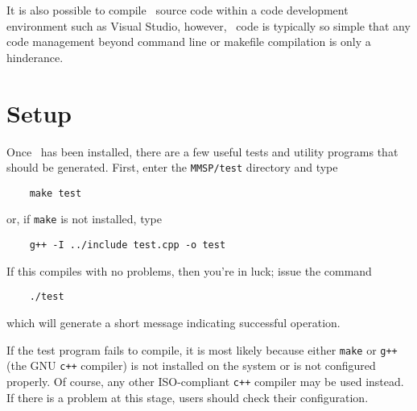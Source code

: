 It is also possible to compile \MMSP\ source code within a code development environment such as Visual Studio, however, \MMSP\ code is typically so simple that any code management beyond command line or makefile compilation is only a hinderance.

\section{Setup}
Once \MMSP\ has been installed, there are a few useful tests and utility programs that should be generated.  First, enter the {\tt MMSP/test} directory and type
\begin{shadebox}
\begin{verbatim}
    make test
\end{verbatim}
\end{shadebox}
or, if {\tt make} is not installed, type
\begin{shadebox}
\begin{verbatim}
    g++ -I ../include test.cpp -o test
\end{verbatim}
\end{shadebox}
If this compiles with no problems, then you're in luck; issue the command
\begin{shadebox}
\begin{verbatim}
    ./test
\end{verbatim}
\end{shadebox}
which will generate a short message indicating successful operation.

If the test program fails to compile, it is most likely because either {\tt make} or {\tt g++} (the GNU {\tt c++} compiler) is not installed on the system or is not configured properly.  Of course, any other ISO-compliant {\tt c++} compiler may be used instead.  If there is a problem at this stage, users should check their configuration.

